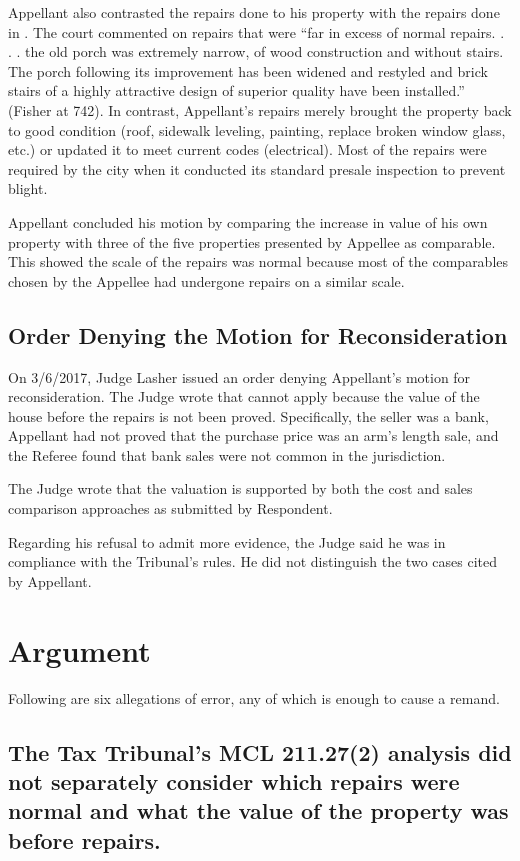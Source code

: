 \documentclass[12pt,\documentclassflag]{michiganCourtOfAppealsBrief}
\begin{document}
Appellant also contrasted the repairs done to his property with the repairs done in \cite[s]{Fisher}. The court commented on repairs that were ``far in excess of normal repairs. . . . the old porch was extremely narrow, of wood construction and without stairs. The porch following its improvement has been widened and restyled and brick stairs of a highly attractive design of superior quality have been installed.'' (Fisher at 742). In contrast, Appellant's repairs merely brought the property back to good condition (roof, sidewalk leveling, painting, replace broken window glass, etc.) or updated it to meet current codes (electrical). Most of the repairs were required by the city when it conducted its standard presale inspection to prevent blight.

Appellant concluded his motion by comparing the increase in value of his own property with three of the five properties presented by Appellee as comparable. This showed the scale of the repairs was normal because most of the comparables chosen by the Appellee had undergone repairs on a similar scale.

\subsection{Order Denying the Motion for Reconsideration}

On 3/6/2017, Judge Lasher issued an order denying Appellant's motion for reconsideration. The Judge wrote that  cannot apply because the value of the house before the repairs is not been proved. Specifically, the seller was a bank, Appellant had not proved that the purchase price was an arm's length sale, and the Referee found that bank sales were not common in the jurisdiction. 

The Judge wrote that the valuation is supported by both the cost and sales comparison approaches as submitted by Respondent. 

Regarding his refusal to admit more evidence, the Judge said he was in compliance with the Tribunal's rules. He did not distinguish the two cases cited by Appellant. 

\section{Argument}

Following are six allegations of error, any of which is enough to cause a remand. 


\subsection{The Tax Tribunal's MCL 211.27(2) analysis did not separately consider which repairs were normal and what the value of the property was before repairs.} \label{incoherent}
\end{document}

